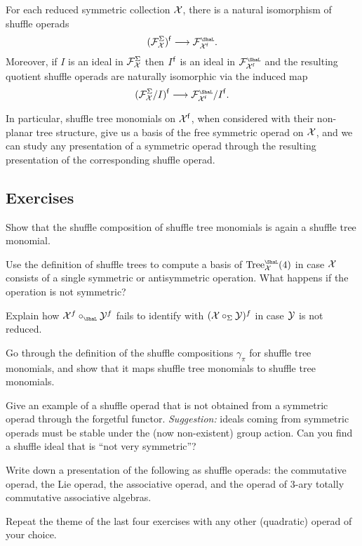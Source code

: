 \begin{corollary}
For each reduced symmetric collection $\mathcal{X}$, 
there is a natural isomorphism of shuffle operads
\[
(\FF_\XX^\Sigma)^{\f}
 \longrightarrow \FF_{\XX^{\f}}^\Sha.
\]
Moreover, if $I$ is an ideal in $\mathcal{F}_{\mathcal{X}}^\Sigma$
then $I^{\mathsf{f}}$ is an ideal in $\FF_{\XX^\f}^\Sha$ and the
resulting quotient shuffle operads are naturally
isomorphic via the induced map
\[
(\FF_\XX^\Sigma/ I )^{\f}
 \longrightarrow \FF_{\XX^{\f}}^\Sha/ I^\f.
\]
\end{corollary}

In particular, shuffle tree monomials on $\mathcal{X}^{\mathsf{f}}$, when
considered with their non-planar tree structure,
give us a basis of the free symmetric operad on 
$\mathcal{X}$, and we can study any presentation of a symmetric
operad through the resulting presentation of the
corresponding shuffle operad. 

\subsection{Exercises}

\begin{question}\label{ex:shufflecomp}
 Show that the shuffle composition of shuffle tree
monomials is again a shuffle tree
monomial.
\end{question}
 
\begin{question}
Use the definition of shuffle trees
to compute a basis
of $\mathrm{Tree}_\XX^\Sha(4)$ in case $\mathcal{X}$ consists
of a single symmetric or antisymmetric
operation. What happens if the operation
is not symmetric?
\end{question}

\begin{question} Explain how 
$\XX^f \circ_\Sha \YY^f$ fails
 to identify with  $(\mathcal{X}\circ_\Sigma \mathcal{Y})^f$ 
 in case $\mathcal{Y}$ is
 not reduced. 
\end{question}

\begin{question}
Go through the definition of the shuffle
compositions $\gamma_\pi$ for shuffle
tree monomials, and show that it maps
shuffle tree monomials to shuffle tree
monomials.
\end{question}

\begin{question} 
Give an example of a shuffle operad that
is not obtained from a symmetric operad
through the forgetful functor. \emph{Suggestion:}
ideals coming from symmetric operads must be
stable under the (now non-existent) group action.
Can you find a shuffle ideal that is ``not very
symmetric''?
\end{question}

\begin{question}
Write down a presentation of the following as
shuffle operads: the  
commutative operad, the
Lie operad, the
associative operad, and the
operad of $3$-ary totally commutative
associative algebras.
\end{question}

\begin{question}
Repeat the theme of the last four exercises
with any other (quadratic) operad
of your choice.
\end{question}
